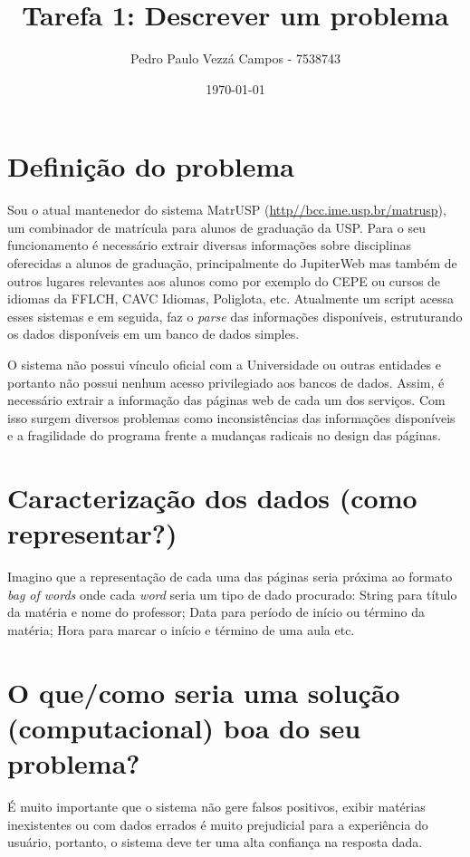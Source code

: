 \documentclass[brazil]{article}
\begin{document}
\title{Tarefa 1: Descrever um problema}
\author{Pedro Paulo Vezzá Campos - 7538743}
\date{\today}

\maketitle



\section{Definição do problema}
Sou o atual mantenedor do sistema MatrUSP (\url{http//bcc.ime.usp.br/matrusp}), 
um combinador de matrícula para alunos de graduação da USP. Para o seu funcionamento
é necessário extrair diversas informações sobre disciplinas oferecidas a alunos de graduação, principalmente
do JupiterWeb mas também de outros lugares relevantes aos alunos como por exemplo
do CEPE ou cursos de idiomas da FFLCH, CAVC Idiomas, Poliglota, etc. Atualmente um script
acessa esses sistemas e em seguida, faz o \emph{parse} das informações disponíveis, 
estruturando os dados disponíveis em um banco de dados simples.

O sistema não possui vínculo oficial com a Universidade ou outras entidades 
e portanto não possui nenhum acesso privilegiado aos bancos de dados. Assim, é
necessário extrair a informação das páginas web de cada um dos serviços. Com isso
surgem diversos problemas como inconsistências das informações disponíveis e a
fragilidade do programa frente a mudanças radicais no design das páginas.


\section{Caracterização dos dados (como representar?)}
Imagino que a representação de cada uma das páginas seria próxima ao formato
\emph{bag of words} onde cada \emph{word} seria um tipo de dado procurado: String
para título da matéria e nome do professor; Data para período de início ou 
término da matéria; Hora para marcar o início e término de uma aula etc.


\section{O que/como seria uma solução (computacional) boa do seu problema?}
É muito importante que o sistema não gere falsos positivos, exibir matérias 
inexistentes ou com dados errados é muito prejudicial para a experiência do usuário, 
portanto, o sistema deve ter uma alta confiança na resposta dada.
\end{document}
